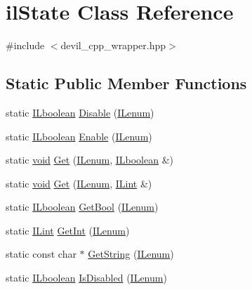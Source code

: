 \hypertarget{classil_state}{\section{il\-State Class Reference}
\label{classil_state}
}


{\ttfamily \#include $<$devil\-\_\-cpp\-\_\-wrapper.\-hpp$>$}

\subsection*{Static Public Member Functions}
\begin{DoxyCompactItemize}
\item 
static \hyperlink{il_8h_a8be80d75c2c636b9f2250fe10c2e7874}{I\-Lboolean} \hyperlink{classil_state_a8818758568eb30bef3c5c51990cb6e3e}{Disable} (\hyperlink{il_8h_a1542f3a70c0c5370a30a1fa5ce349e2d}{I\-Lenum})
\item 
static \hyperlink{il_8h_a8be80d75c2c636b9f2250fe10c2e7874}{I\-Lboolean} \hyperlink{classil_state_aec8205a9143ff9ccff0db5fde65dbbe5}{Enable} (\hyperlink{il_8h_a1542f3a70c0c5370a30a1fa5ce349e2d}{I\-Lenum})
\item 
static \hyperlink{il_8h_a5530e04d947bcddd83639ea7940faf10}{void} \hyperlink{classil_state_abd3b4fb16c305d42eeb941f02dd16b83}{Get} (\hyperlink{il_8h_a1542f3a70c0c5370a30a1fa5ce349e2d}{I\-Lenum}, \hyperlink{il_8h_a8be80d75c2c636b9f2250fe10c2e7874}{I\-Lboolean} \&)
\item 
static \hyperlink{il_8h_a5530e04d947bcddd83639ea7940faf10}{void} \hyperlink{classil_state_a63529f7c30750d778d910d6de835f1c7}{Get} (\hyperlink{il_8h_a1542f3a70c0c5370a30a1fa5ce349e2d}{I\-Lenum}, \hyperlink{il_8h_a288a97fb9e92e707a60b749d0039fafe}{I\-Lint} \&)
\item 
static \hyperlink{il_8h_a8be80d75c2c636b9f2250fe10c2e7874}{I\-Lboolean} \hyperlink{classil_state_a40ce90024fc70ab01bb4c0494ab73765}{Get\-Bool} (\hyperlink{il_8h_a1542f3a70c0c5370a30a1fa5ce349e2d}{I\-Lenum})
\item 
static \hyperlink{il_8h_a288a97fb9e92e707a60b749d0039fafe}{I\-Lint} \hyperlink{classil_state_ae5f6d9b3399e250d210182b92e8853d2}{Get\-Int} (\hyperlink{il_8h_a1542f3a70c0c5370a30a1fa5ce349e2d}{I\-Lenum})
\item 
static const char $\ast$ \hyperlink{classil_state_aaf91c40750bf9c2fe77a6295e4511a01}{Get\-String} (\hyperlink{il_8h_a1542f3a70c0c5370a30a1fa5ce349e2d}{I\-Lenum})
\item 
static \hyperlink{il_8h_a8be80d75c2c636b9f2250fe10c2e7874}{I\-Lboolean} \hyperlink{classil_state_a3a4cdb8d35bf94dee34d56595f3037f4}{Is\-Disabled} (\hyperlink{il_8h_a1542f3a70c0c5370a30a1fa5ce349e2d}{I\-Lenum})

\end{DoxyCompactItemize}
